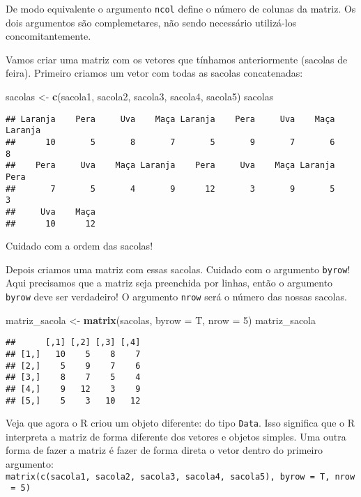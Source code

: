 \documentclass[]{book}
\newenvironment{Shaded}{\begin{snugshade}}{\end{snugshade}}
\newcommand{\DataTypeTok}[1]{\textcolor[rgb]{0.13,0.29,0.53}{#1}}
\newcommand{\DecValTok}[1]{\textcolor[rgb]{0.00,0.00,0.81}{#1}}
\newcommand{\KeywordTok}[1]{\textcolor[rgb]{0.13,0.29,0.53}{\textbf{#1}}}
\newcommand{\NormalTok}[1]{#1}
\newcommand{\StringTok}[1]{\textcolor[rgb]{0.31,0.60,0.02}{#1}}
\theoremstyle{definition}
\theoremstyle{definition}
\theoremstyle{definition}
\theoremstyle{remark}
\begin{document}
De modo equivalente o argumento \texttt{ncol} define o número de colunas da matriz. Os dois argumentos são complemetares, não sendo necessário utilizá-los concomitantemente.

Vamos criar uma matriz com os vetores que tínhamos anteriormente (sacolas de feira). Primeiro criamos um vetor com todas as sacolas concatenadas:

\begin{Shaded}
\begin{Highlighting}[]
\NormalTok{sacolas <-}\StringTok{ }\KeywordTok{c}\NormalTok{(sacola1, sacola2, sacola3, sacola4, sacola5)}
\NormalTok{sacolas}
\end{Highlighting}
\end{Shaded}

\begin{verbatim}
## Laranja    Pera     Uva    Maça Laranja    Pera     Uva    Maça Laranja 
##      10       5       8       7       5       9       7       6       8 
##    Pera     Uva    Maça Laranja    Pera     Uva    Maça Laranja    Pera 
##       7       5       4       9      12       3       9       5       3 
##     Uva    Maça 
##      10      12
\end{verbatim}

Cuidado com a ordem das sacolas!

Depois criamos uma matriz com essas sacolas. Cuidado com o argumento \texttt{byrow}! Aqui precisamos que a matriz seja preenchida por linhas, então o argumento \texttt{byrow} deve ser verdadeiro! O argumento \texttt{nrow} será o número das nossas sacolas.

\begin{Shaded}
\begin{Highlighting}[]
\NormalTok{matriz_sacola <-}\StringTok{ }\KeywordTok{matrix}\NormalTok{(sacolas, }\DataTypeTok{byrow =}\NormalTok{ T, }\DataTypeTok{nrow =} \DecValTok{5}\NormalTok{)}
\NormalTok{matriz_sacola}
\end{Highlighting}
\end{Shaded}

\begin{verbatim}
##      [,1] [,2] [,3] [,4]
## [1,]   10    5    8    7
## [2,]    5    9    7    6
## [3,]    8    7    5    4
## [4,]    9   12    3    9
## [5,]    5    3   10   12
\end{verbatim}

Veja que agora o R criou um objeto diferente: do tipo \texttt{Data}. Isso significa que o R interpreta a matriz de forma diferente dos vetores e objetos simples. Uma outra forma de fazer a matriz é fazer de forma direta o vetor dentro do primeiro argumento: \texttt{matrix(c(sacola1,\ sacola2,\ sacola3,\ sacola4,\ sacola5),\ byrow\ =\ T,\ nrow\ =\ 5)}
\end{document}
